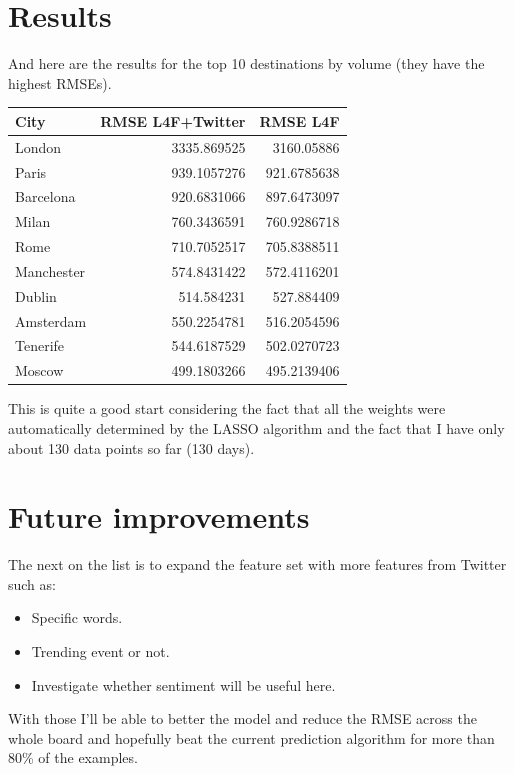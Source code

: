 \documentclass[minf,frontabs,twoside,singlespacing,parskip]{infthesis} %
\begin{document}
\newpage
\section{Results}

And here are the results for the top 10 destinations by volume (they have the highest RMSEs).

\begin{tabular}{ l | r | r }
City	& RMSE L4F+Twitter &RMSE L4F \\
\hline
London & 3335.869525 & 3160.05886 \\
Paris	 & 939.1057276 & 921.6785638  \\
Barcelona & 920.6831066 & 897.6473097  \\
Milan & 760.3436591 & 760.9286718  \\
Rome & 710.7052517 & 705.8388511  \\
Manchester & 574.8431422 & 572.4116201  \\
Dublin & 514.584231	 & 527.884409  \\
Amsterdam & 550.2254781 & 516.2054596  \\
Tenerife & 544.6187529 & 502.0270723  \\
Moscow & 499.1803266 & 495.2139406  \\
\end{tabular}


This is quite a good start considering the fact that all the weights were automatically determined by the LASSO algorithm and the fact that I have only about 130 data points so far (130 days).

\section{Future improvements}

The next on the list is to expand the feature set with more features from Twitter such as:


\begin{itemize}
\item Specific words.
\item Trending event or not.
\item Investigate whether sentiment will be useful here.
\end{itemize}

With those I'll be able to better the model and reduce the RMSE across the whole board and hopefully beat the current prediction algorithm for more than 80\% of the examples.
\end{document}
